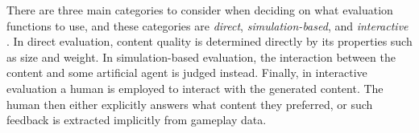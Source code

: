 There are three main categories to consider when deciding on what evaluation functions to use, and these categories are \textit{direct}, \textit{simulation-based}, and \textit{interactive} \cite[p.5-7]{search_based_pcg}.
In direct evaluation, content quality is determined directly by its properties such as size and weight.
In simulation-based evaluation, the interaction between the content and some artificial agent is judged instead.
Finally, in interactive evaluation a human is employed to interact with the generated content.
The human then either explicitly answers what content they preferred, or such feedback is extracted implicitly from gameplay data.
